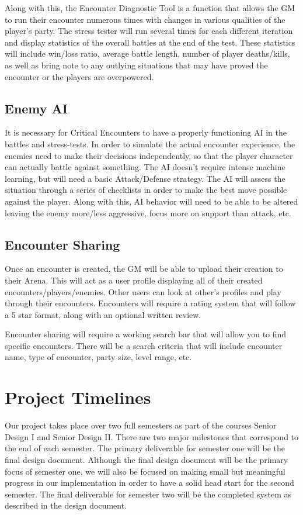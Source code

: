 \documentclass[12pt,a4paper]{report}
\begin{document}
		Along with this, the Encounter Diagnostic Tool is a function that allows the GM to run their encounter numerous times with changes in various qualities of the player's party. The stress tester will run several times for each different iteration and display statistics of the overall battles at the end of the test. These statistics will include win/loss ratio, average battle length, number of player deaths/kills, as well as bring note to any outlying situations that may have proved the encounter or the players are overpowered.  
		\subsection{Enemy AI}
		It is necessary for Critical Encounters to have a properly functioning AI in the battles and stress-tests. In order to simulate the actual encounter experience, the enemies need to make their decisions independently, so that the player character can actually battle against something. The AI doesn't require intense machine learning, but will need a basic Attack/Defense strategy. The AI will assess the situation through a series of checklists in order to make the best move possible against the player. Along with this, AI behavior will need to be able to be altered leaving the enemy more/less aggressive, focus more on support than attack, etc.
		\subsection{Encounter Sharing}
		Once an encounter is created, the GM will be able to upload their creation to their Arena. This will act as a user profile displaying all of their created encounters/players/enemies. Other users can look at other's profiles and play through their encounters. Encounters will require a rating system that will follow a 5 star format, along with an optional written review.
		
		Encounter sharing will require a working search bar that will allow you to find specific encounters. There will be a search criteria that will include encounter name, type of encounter, party size, level range, etc.
	\section{Project Timelines}
	Our project takes place over two full semesters as part of the courses Senior Design I and Senior Design II. There are two major milestones that correspond to the end of each semester. The primary deliverable for semester one will be the final design document. Although the final design document will be the primary focus of semester one, we will also be focused on making small but meaningful progress in our implementation in order to have a solid head start for the second semester. The final deliverable for semester two will be the completed system as described in the design document. 
	
\end{document}
